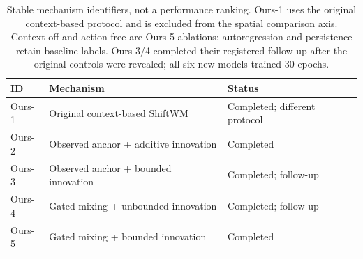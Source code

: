 \begin{table}[!htbp]
\centering\small
\setlength{\tabcolsep}{4pt}
\begin{tabular}{@{}lp{.49\linewidth}p{.27\linewidth}@{}}
\toprule ID & Mechanism & Status \\
\midrule
Ours-1 & Original context-based ShiftWM & Completed; different protocol \\
Ours-2 & Observed anchor + additive innovation & Completed \\
Ours-3 & Observed anchor + bounded innovation & Completed; follow-up \\
Ours-4 & Gated mixing + unbounded innovation & Completed; follow-up \\
Ours-5 & Gated mixing + bounded innovation & Completed \\
\bottomrule\end{tabular}
\caption{Stable mechanism identifiers, not a performance ranking. Ours-1 uses the original context-based protocol and is excluded from the spatial comparison axis. Context-off and action-free are Ours-5 ablations; autoregression and persistence retain baseline labels. Ours-3/4 completed their registered follow-up after the original controls were revealed; all six new models trained 30 epochs.}
\label{tab:spatial-version-key}
\end{table}
